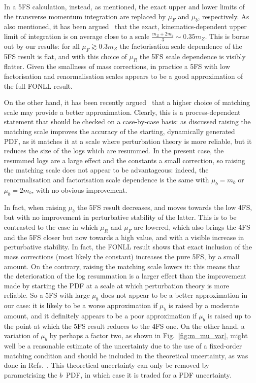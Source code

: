 \documentclass[12pt]{article}
\begin{document}
In a 5FS calculation, instead, as mentioned, the exact upper and lower
limits of the transverse momentum integration are replaced by $\mu_F$
and $\mu_b$, respectively. As also mentioned, it has been
argued~\cite{Maltoni:2012pa,Lim:2016wjo} 
that the exact, kinematics-dependent upper limit of integration is
on average close to a scale $\frac{m_Z+2m_b}{3}\sim 0.35m_Z$. This is
borne out by our results: for all $\mu_F\gtrsim0.3m_Z$ the 
factorisation scale dependence of the 5FS result is flat, and with
this choice of $\mu_R$ the 5FS scale dependence is visibly
flatter. Given the smallness of mass
corrections, in practice a 5FS with low factorisation and
renormalisation scales appears to be a good approximation of the full
FONLL result.

On the other hand, it has been recently argued~\cite{Bertone:2017djs}
that a higher choice of matching scale may provide a better
approximation. Clearly, this is a process-dependent statement that
should be checked on a case-by-case basis: as discussed raising the
matching scale improves the accuracy of the starting, dynamically
generated PDF, as it matches it at a scale where perturbation theory
is more reliable, but it reduces the size of the logs which are
resummed. In the present case, the resummed logs are a large effect
and the constants a small correction, so raising the matching scale
does not appear to be advantageous: indeed, the renormalisation and
factorisation scale dependence is the same with $\mu_b=m_b$ or
$\mu_b=2m_b$, with no obvious improvement. 


In fact, when raising $\mu_b$
the 5FS result decreases, and moves towards the low 4FS, but with no
improvement in perturbative stability of the latter. This is to be
contrasted to the case in which $\mu_R$ and $\mu_F$ are lowered, which
also brings the 4FS and the 5FS closer but now towards a high value,
and with a visible increase in perturbative stability. In fact, the
FONLL result shows that exact inclusion of the mass corrections (most
likely the constant) increases the pure 5FS, by a small
amount. On the contrary, raising the matching scale lowers it: this
means that the deterioration of the log resummation is a larger effect
than the improvement made by starting the PDF at a scale at which
perturbation theory is more reliable.
So a 5FS with
large $\mu_b$ does not appear to be a better approximation in our case:
it is likely to be a worse approximation if  $\mu_b$ is raised by a
moderate amount,
and it definitely appears to be a poor approximation if $\mu_b$ is
raised up to the point at which the 5FS result reduces to the 4FS
one. On the other hand, a variation of $\mu_b$ by perhaps a factor
two, as shown in Fig.~\ref{fig:m_mu_var}, might well be a reasonable
estimate of the uncertainty due to the use of a fixed-order matching
condition and should be included in the theoretical uncertainty, as was
done in Refs.~\cite{Bonvini:2016fgf,deFlorian:2016spz}. This theoretical
uncertainty can only be removed by parametrising the $b$~PDF, in which
case it is  traded for a PDF uncertainty.
\end{document}
